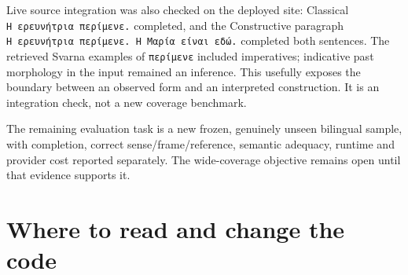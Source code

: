 \documentclass[11pt,a4paper]{article}
\begin{document}
Live source integration was also checked on the deployed site: Classical
\texttt{Η\ ερευνήτρια\ περίμενε.} completed, and the Constructive
paragraph \texttt{Η\ ερευνήτρια\ περίμενε.\ Η\ Μαρία\ είναι\ εδώ.}
completed both sentences. The retrieved Svarna examples of
\texttt{περίμενε} included imperatives; indicative past morphology in
the input remained an inference. This usefully exposes the boundary
between an observed form and an interpreted construction. It is an
integration check, not a new coverage benchmark.

The remaining evaluation task is a new frozen, genuinely unseen
bilingual sample, with completion, correct sense/frame/reference,
semantic adequacy, runtime and provider cost reported separately. The
wide-coverage objective remains open until that evidence supports it.

\section{Where to read and change the
code}\label{where-to-read-and-change-the-code}
\end{document}
